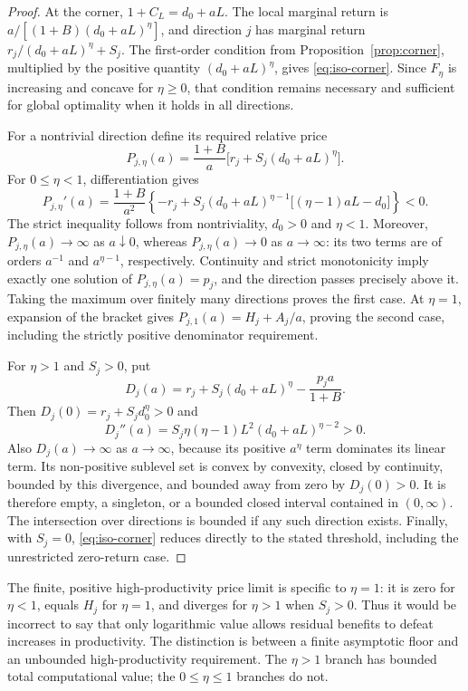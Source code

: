 \begin{proof}
At the corner, $1+C_L=d_0+aL$. The local marginal return is
$a/[(1+B)(d_0+aL)^\eta]$, and direction $j$ has marginal return
$r_j/(d_0+aL)^\eta+S_j$. The first-order condition from
Proposition~\ref{prop:corner}, multiplied by the positive quantity
$(d_0+aL)^\eta$, gives \eqref{eq:iso-corner}. Since $F_\eta$ is
increasing and concave for $\eta\geq0$, that condition remains necessary
and sufficient for global optimality when it holds in all directions.

For a nontrivial direction define its required relative price
\[
 P_{j,\eta}(a)=\frac{1+B}{a}\big[r_j+S_j(d_0+aL)^\eta\big].
\]
For $0\leq\eta<1$, differentiation gives
\[
 P_{j,\eta}'(a)=\frac{1+B}{a^2}
 \left\{-r_j+S_j(d_0+aL)^{\eta-1}
 \big[(\eta-1)aL-d_0\big]\right\}<0.
\]
The strict inequality follows from nontriviality, $d_0>0$ and
$\eta<1$. Moreover, $P_{j,\eta}(a)\to\infty$ as $a\downarrow0$,
whereas $P_{j,\eta}(a)\to0$ as $a\to\infty$: its two terms are of
orders $a^{-1}$ and $a^{\eta-1}$, respectively. Continuity and strict
monotonicity imply exactly one solution of $P_{j,\eta}(a)=p_j$,
and the direction passes precisely above it. Taking the maximum over
finitely many directions proves the first case. At $\eta=1$, expansion
of the bracket gives $P_{j,1}(a)=H_j+A_j/a$, proving the second case,
including the strictly positive denominator requirement.

For $\eta>1$ and $S_j>0$, put
\[
 D_j(a)=r_j+S_j(d_0+aL)^\eta-\frac{p_j a}{1+B}.
\]
Then $D_j(0)=r_j+S_jd_0^\eta>0$ and
\[
 D_j''(a)=S_j\eta(\eta-1)L^2(d_0+aL)^{\eta-2}>0.
\]
Also $D_j(a)\to\infty$ as $a\to\infty$, because its positive
$a^\eta$ term dominates its linear term. Its non-positive sublevel set
is convex by convexity, closed by continuity, bounded by this divergence,
and bounded away from zero by $D_j(0)>0$. It is therefore empty, a
singleton, or a bounded closed interval contained in $(0,\infty)$.
The intersection over directions is bounded if any such direction exists.
Finally, with $S_j=0$, \eqref{eq:iso-corner} reduces directly to the
stated threshold, including the unrestricted zero-return case.
\end{proof}
The finite, positive high-productivity price limit is specific to
$\eta=1$: it is zero for $\eta<1$, equals $H_j$ for $\eta=1$, and
diverges for $\eta>1$ when $S_j>0$. Thus it would be incorrect to say
that only logarithmic value allows residual benefits to defeat increases
in productivity. The distinction is between a finite asymptotic floor and
an unbounded high-productivity requirement. The $\eta>1$ branch has
bounded total computational value; the $0\leq\eta\leq1$ branches do not.

